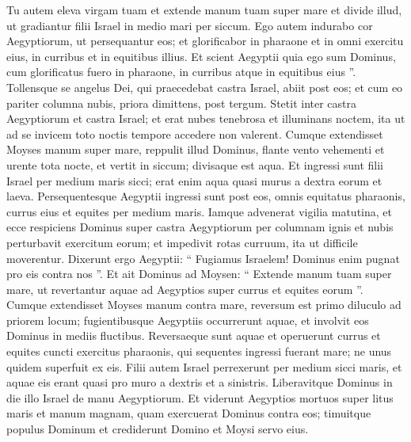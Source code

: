 \begin{biblechapter}
\begin{biblechapter}
\begin{biblechapter}
\begin{biblechapter}
\begin{biblechapter}
\begin{biblechapter}
\begin{biblechapter}
\begin{biblechapter}
\begin{biblechapter}
\begin{biblechapter}
\begin{biblechapter}
\begin{biblechapter}
\begin{biblechapter}
\begin{biblechapter}
\verse Tu autem eleva virgam tuam et extende manum tuam super mare et divide illud, ut gradiantur filii Israel in medio mari per siccum. 
 \verse Ego autem indurabo cor Aegyptiorum, ut persequantur eos; et glorificabor in pharaone et in omni exercitu eius, in curribus et in equitibus illius. 
\verse Et scient Aegyptii quia ego sum Dominus, cum glorificatus fuero in pharaone, in curribus atque in equitibus eius ”.
 \verse Tollensque se angelus Dei, qui praecedebat castra Israel, abiit post eos; et cum eo pariter columna nubis, priora dimittens, post tergum. 
\verse Stetit inter castra Aegyptiorum et castra Israel; et erat nubes tenebrosa et illuminans noctem, ita ut ad se invicem toto noctis tempore accedere non valerent.
 \verse Cumque extendisset Moyses manum super mare, reppulit illud Dominus, flante vento vehementi et urente tota nocte, et vertit in siccum; divisaque est aqua. 
\verse Et ingressi sunt filii Israel per medium maris sicci; erat enim aqua quasi murus a dextra eorum et laeva. 
\verse Persequentesque Aegyptii ingressi sunt post eos, omnis equitatus pharaonis, currus eius et equites per medium maris. 
\verse Iamque advenerat vigilia matutina, et ecce respiciens Dominus super castra Aegyptiorum per columnam ignis et nubis perturbavit exercitum eorum; 
\verse et impedivit rotas curruum, ita ut difficile moverentur. Dixerunt ergo Aegyptii: “ Fugiamus Israelem! Dominus enim pugnat pro eis contra nos ”.
 \verse Et ait Dominus ad Moysen: “ Extende manum tuam super mare, ut revertantur aquae ad Aegyptios super currus et equites eorum ”. 
\verse Cumque extendisset Moyses manum contra mare, reversum est primo diluculo ad priorem locum; fugientibusque Aegyptiis occurrerunt aquae, et involvit eos Dominus in mediis fluctibus. 
\verse Reversaeque sunt aquae et operuerunt currus et equites cuncti exercitus pharaonis, qui sequentes ingressi fuerant mare; ne unus quidem superfuit ex eis. 
\verse Filii autem Israel perrexerunt per medium sicci maris, et aquae eis erant quasi pro muro a dextris et a sinistris.
 \verse Liberavitque Dominus in die illo Israel de manu Aegyptiorum. Et viderunt Aegyptios mortuos super litus maris 
\verse et manum magnam, quam exercuerat Dominus contra eos; timuitque populus Dominum et crediderunt Domino et Moysi servo eius.
 

\end{biblechapter}
\end{biblechapter}
\end{biblechapter}
\end{biblechapter}
\end{biblechapter}
\end{biblechapter}
\end{biblechapter}
\end{biblechapter}
\end{biblechapter}
\end{biblechapter}
\end{biblechapter}
\end{biblechapter}
\end{biblechapter}
\end{biblechapter}
